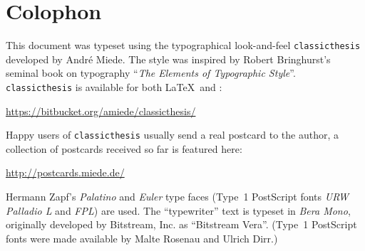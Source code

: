 \pagestyle{empty}

\hfill

\vfill


\section*{Colophon}
This document was typeset using the typographical look-and-feel \texttt{classicthesis} developed by Andr\'e Miede. 
The style was inspired by Robert Bringhurst's seminal book on typography ``\emph{The Elements of Typographic Style}''. 
\texttt{classicthesis} is available for both \LaTeX\ and \mLyX: 
\begin{center}
\url{https://bitbucket.org/amiede/classicthesis/}
\end{center}
Happy users of \texttt{classicthesis} usually send a real postcard to the author, a collection of postcards received so far is featured here: 
\begin{center}
\url{http://postcards.miede.de/}
\end{center}
 
\bigskip

\noindent\finalVersionString

Hermann Zapf's \emph{Palatino} and \emph{Euler} type faces (Type~1 PostScript fonts \emph{URW
Palladio L} and \emph{FPL}) are used. The ``typewriter'' text is typeset in \emph{Bera Mono}, 
originally developed by Bitstream, Inc. as ``Bitstream Vera''. (Type~1 PostScript fonts were made 
available by Malte Rosenau and
Ulrich Dirr.)







